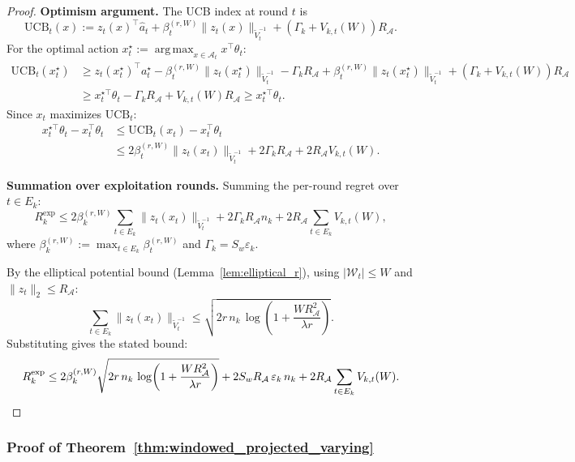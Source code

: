 \documentclass{article}
\newcommand{\cA}{\mathcal{A}}
\DeclareMathOperator*{\argmax}{arg\,max}
\begin{document}
\begin{proof}
\textbf{Optimism argument.}
The UCB index at round $t$ is
\[
\mathrm{UCB}_t(x) := z_t(x)^\top \widehat a_t + \beta_t^{(r,W)}\|z_t(x)\|_{\widetilde V_t^{-1}} + (\Gamma_k + V_{k,t}(W))R_{\cA}.
\]
For the optimal action $x_t^\star := \argmax_{x \in \cA_t} x^\top\theta_t$:
\begin{align*}
\mathrm{UCB}_t(x_t^\star)
&\ge z_t(x_t^\star)^\top a_t^\star - \beta_t^{(r,W)}\|z_t(x_t^\star)\|_{\widetilde V_t^{-1}} - \Gamma_k R_{\cA} + \beta_t^{(r,W)}\|z_t(x_t^\star)\|_{\widetilde V_t^{-1}} + (\Gamma_k + V_{k,t}(W))R_{\cA} \\
&\ge x_t^{\star\top}\theta_t - \Gamma_k R_{\cA} + V_{k,t}(W) R_{\cA}
\ge x_t^{\star\top}\theta_t.
\end{align*}
Since $x_t$ maximizes $\mathrm{UCB}_t$:
\begin{align*}
x_t^{\star\top}\theta_t - x_t^\top\theta_t
&\le \mathrm{UCB}_t(x_t) - x_t^\top\theta_t \\
&\le 2\beta_t^{(r,W)}\|z_t(x_t)\|_{\widetilde V_t^{-1}} + 2\Gamma_k R_{\cA} + 2R_{\cA} V_{k,t}(W).
\end{align*}

\textbf{Summation over exploitation rounds.}
Summing the per-round regret over $t \in E_k$:
\[
R_k^{\mathrm{exp}} \le 2\beta_k^{(r,W)} \sum_{t \in E_k}\|z_t(x_t)\|_{\widetilde V_t^{-1}} + 2\Gamma_k R_{\cA} n_k + 2R_{\cA}\sum_{t \in E_k} V_{k,t}(W),
\]
where $\beta_k^{(r,W)} := \max_{t \in E_k}\beta_t^{(r,W)}$ and $\Gamma_k = S_w\varepsilon_k$.

By the elliptical potential bound (Lemma~\ref{lem:elliptical_r}), using $|\mathcal{W}_t| \le W$ and $\|z_t\|_2 \le R_{\cA}$:
\[
\sum_{t \in E_k}\|z_t(x_t)\|_{\widetilde V_t^{-1}}
\le \sqrt{2r\,n_k\,\log\!\left(1 + \frac{W R_{\cA}^2}{\lambda r}\right)}.
\]
Substituting gives the stated bound:
\[
R_k^{\mathrm{exp}} \le
2\beta_k^{(r,W)}\sqrt{2r\,n_k\,\log\!\left(1+\frac{W R_{\cA}^2}{\lambda r}\right)}
+ 2S_w R_{\cA}\,\varepsilon_k\,n_k
+ 2R_{\cA}\sum_{t\in E_k} V_{k,t}(W). \qedhere
\]
\end{proof}

\subsubsection{Proof of Theorem~\ref{thm:windowed_projected_varying}}
\label{proof:windowed_projected_varying}
\end{document}
